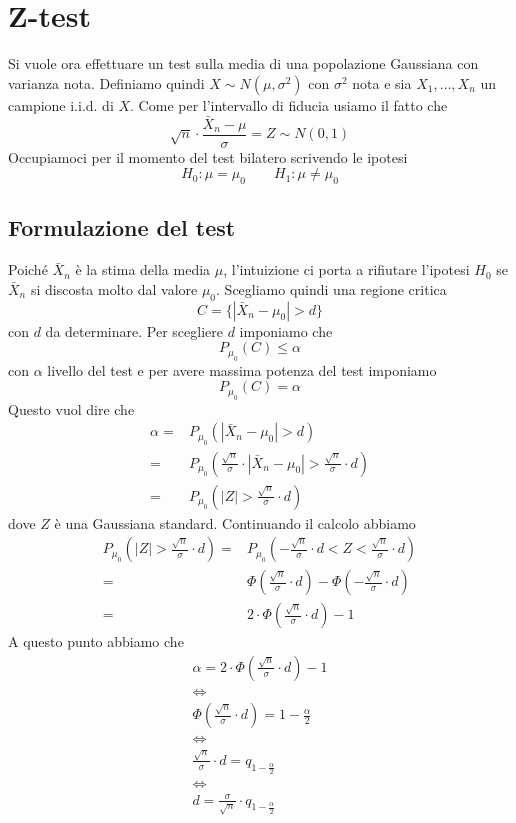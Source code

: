 \section{Z-test}
Si vuole ora effettuare un test sulla media di una popolazione Gaussiana con varianza nota.
Definiamo quindi $X \sim N(\mu, \sigma^2)$ con $\sigma^2$ nota e sia $X_1, \dots, X_n$ un campione
i.i.d. di $X$. Come per l'intervallo di fiducia usiamo il fatto che
\[ \sqrt{n} \cdot \frac{\bar{X}_n - \mu}{\sigma} = Z \sim N(0,1) \]
Occupiamoci per il momento del test bilatero scrivendo le ipotesi
\[ H_0: \mu = \mu_0 \qquad H_1: \mu \neq \mu_0 \]

\subsection{Formulazione del test}
Poiché $\bar{X}_n$ è la stima della media $\mu$, l'intuizione ci porta a rifiutare l'ipotesi $H_0$
se $\bar{X}_n$ si discosta molto dal valore $\mu_0$. Scegliamo quindi una regione critica
\[ C = \{ | \bar{X}_n - \mu_0 | > d \} \]
con $d$ da determinare. Per scegliere $d$ imponiamo che
\[ P_{\mu_0} (C) \leq \alpha \]
con $\alpha$ livello del test e per avere massima potenza del test imponiamo
\[ P_{\mu_0} (C) = \alpha \]
Questo vuol dire che
\begin{align*}
	\alpha = & P_{\mu_0} ( | \bar{X}_n - \mu_0 | > d )                        \\
	=        & P_{\mu_0} \left( \frac{\sqrt{n}}{\sigma} \cdot
	|\bar{X}_n - \mu_0| > \frac{\sqrt{n}}{\sigma} \cdot d \right)             \\
	=        & P_{\mu_0} \left( |Z| > \frac{\sqrt{n}}{\sigma} \cdot d \right)
\end{align*}
dove $Z$ è una Gaussiana standard. Continuando il calcolo abbiamo
\begin{align*}
	P_{\mu_0} \left( |Z| > \frac{\sqrt{n}}{\sigma} \cdot d \right)
	= & P_{\mu_0} \left( -\frac{\sqrt{n}}{\sigma} \cdot d < Z
	< \frac{\sqrt{n}}{\sigma} \cdot d \right)                           \\
	= & \Phi \left( \frac{\sqrt{n}}{\sigma} \cdot d \right) -
	\Phi \left( -\frac{\sqrt{n}}{\sigma} \cdot d \right)                \\
	= & 2 \cdot \Phi \left( \frac{\sqrt{n}}{\sigma} \cdot d \right) - 1
\end{align*}
A questo punto abbiamo che
\begin{gather*}
	\alpha = 2 \cdot \Phi \left( \frac{\sqrt{n}}{\sigma} \cdot d \right) - 1 \\
	\Leftrightarrow \\
	\Phi \left( \frac{\sqrt{n}}{\sigma} \cdot d \right) = 1 - \frac{\alpha}{2} \\
	\Leftrightarrow \\
	\frac{\sqrt{n}}{\sigma} \cdot d = q_{1 - \frac{\alpha}{2}} \\
	\Leftrightarrow \\
	d = \frac{\sigma}{\sqrt{n}} \cdot q_{1 - \frac{\alpha}{2}}
\end{gather*}
